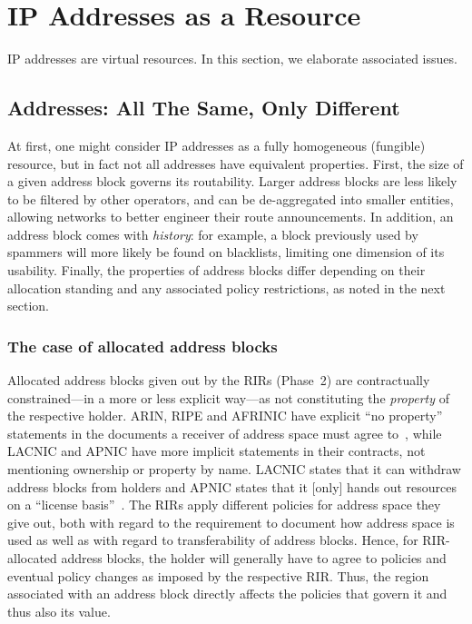 \documentclass[letter]{sigcomm-alternate}
\begin{document}
\section{IP Addresses as a Resource}

IP addresses are virtual resources. In this section, we elaborate associated
issues.

\subsection{Addresses: All The Same, Only Different}

At first, one might consider IP addresses as a fully homogeneous
(fungible) resource, but in fact not all addresses have equivalent properties.
First, the size of a given address block governs its routability.  Larger
address blocks are less likely to be filtered by other operators, and can be
de-aggregated into smaller entities, allowing networks to better engineer their
route announcements.  In addition, an address block comes with \emph{history}:
for example, a block previously used by spammers will more likely be found on
blacklists, limiting one dimension of its usability. Finally, the properties of
address blocks differ depending on their allocation standing and any associated
policy restrictions, as noted in the next section.


\subsubsection{The case of allocated address blocks}

Allocated address blocks given out by the RIRs (Phase~2) are contractually
constrained---in a more or less explicit way---as not constituting the
\emph{property} of the respective holder. ARIN, RIPE and AFRINIC have explicit
``no property'' statements in the documents a receiver of address space must
agree to~\cite{arin_rsa,ripe_property,afrinic_property}, while LACNIC and APNIC
have more implicit statements in their contracts, not mentioning ownership or
property by name. LACNIC states that it can withdraw address blocks from
holders \cite{lacnic_property} and APNIC states that it [only]
hands out resources on a ``license basis''~\cite{apnic_property}. The RIRs apply
different policies for address space they give out, both with regard to
the requirement to document how address space is used as well as with regard
to transferability of address blocks. Hence, for RIR-allocated address blocks,
the holder will generally have to agree to policies and eventual policy changes
as imposed by the respective RIR. Thus, the region associated with an address
block directly affects the policies that govern it and thus also its value.
\end{document}
